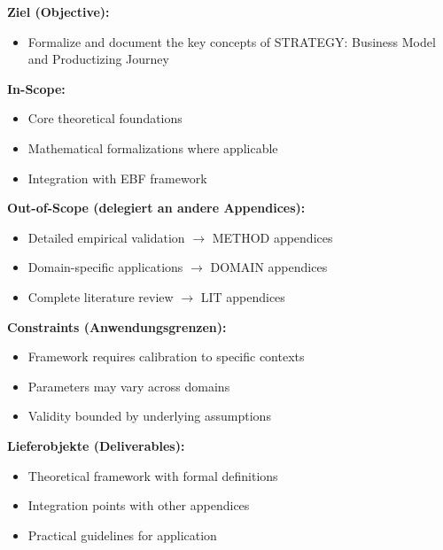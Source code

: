 \begin{tcolorbox}[
    colback=orange!5!white,
    colframe=orange!75!black,
    title={\textbf{Appendix Scope: Ziel / In-Scope / Out-of-Scope / Constraints}},
    fonttitle=\bfseries
]

\textbf{Ziel (Objective):}
\begin{itemize}[nosep]
    \item Formalize and document the key concepts of STRATEGY: Business Model and Productizing Journey
\end{itemize}

\textbf{In-Scope:}
\begin{itemize}[nosep]
    \item Core theoretical foundations
    \item Mathematical formalizations where applicable
    \item Integration with EBF framework
\end{itemize}

\textbf{Out-of-Scope (delegiert an andere Appendices):}
\begin{itemize}[nosep]
    \item Detailed empirical validation $\rightarrow$ METHOD appendices
    \item Domain-specific applications $\rightarrow$ DOMAIN appendices
    \item Complete literature review $\rightarrow$ LIT appendices
\end{itemize}

\textbf{Constraints (Anwendungsgrenzen):}
\begin{itemize}[nosep]
    \item Framework requires calibration to specific contexts
    \item Parameters may vary across domains
    \item Validity bounded by underlying assumptions
\end{itemize}

\textbf{Lieferobjekte (Deliverables):}
\begin{itemize}[nosep]
    \item Theoretical framework with formal definitions
    \item Integration points with other appendices
    \item Practical guidelines for application
\end{itemize}

\end{tcolorbox}




